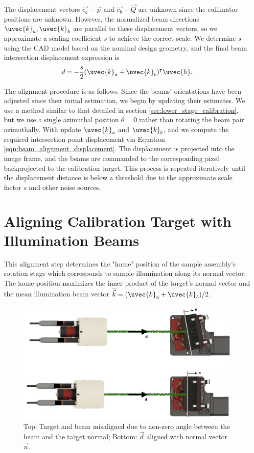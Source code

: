 %
The displacement vectors $\vec{c_a} - \vec{p}$ and $\vec{c_b} - \vec{Q}$ are unknown since the collimator positions are unknown. However, the normalized beam directions $\uvec{k}_a, \uvec{k}_b$ are parallel to these displacement vectors, so we approximate a scaling coefficient $s$ to achieve the correct scale. We determine $s$ using the CAD model based on the nominal design geometry, and the final beam intersection displacement expression is
%
\begin{equation}
    d = -\frac{s}{2} (\uvec{k}_a + \uvec{k}_b)^\intercal \uvec{h}.
    \label{eqn:beam_alignment_displacement}
\end{equation}

The alignment procedure is as follows. Since the beams' orientations have been adjusted since their initial estimation, we begin by updating their estimates. We use a method similar to that detailed in section \ref{sec:lower_stage_calibration}, but we use a single azimuthal position $\theta = 0$ rather than rotating the beam pair azimuthally. With update $\uvec{k}_a$ and $\uvec{k}_b$, and we compute the required intersection point displacement via Equation \ref{eqn:beam_alignment_displacement}. The displacement is projected into the image frame, and the beams are commanded to the corresponding pixel backprojected to the calibration target. This process is repeated iteratively until the displacement distance is below a threshold due to the approximate scale factor $s$ and other noise sources.

\section{Aligning Calibration Target with Illumination Beams}
This alignment step determines the "home" position of the sample assembly's rotation stage which corresponds to sample illumination along its normal vector. The home position maximizes the inner product of the target's normal vector and the mean illumination beam vector $\overline{\vec{k}} = (\uvec{k}_a + \uvec{k}_b)/2$.
\begin{figure}
    \centering
    \includegraphics[width=0.5\linewidth]{figures/target_alignment.png}
    \caption{Top: Target and beam misaligned due to non-zero angle between the beam and the target normal; Bottom: $\vec{d}$ aligned with normal vector $\vec{n}$. }
    \label{fig:sample_beam_alignment}
\end{figure}

